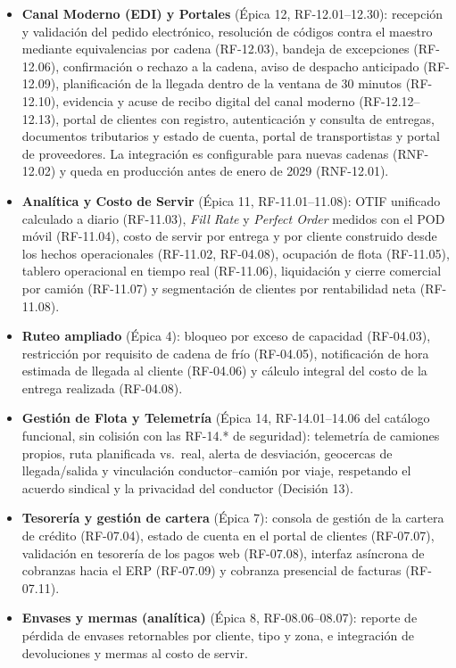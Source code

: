 \begin{itemize}
  \item \textbf{Canal Moderno (EDI) y Portales} (Épica 12, RF-12.01--12.30): recepción y validación del pedido electrónico, resolución de códigos contra el maestro mediante equivalencias por cadena (RF-12.03), bandeja de excepciones (RF-12.06), confirmación o rechazo a la cadena, aviso de despacho anticipado (RF-12.09), planificación de la llegada dentro de la ventana de 30 minutos (RF-12.10), evidencia y acuse de recibo digital del canal moderno (RF-12.12--12.13), portal de clientes con registro, autenticación y consulta de entregas, documentos tributarios y estado de cuenta, portal de transportistas y portal de proveedores. La integración es configurable para nuevas cadenas (RNF-12.02) y queda en producción antes de enero de 2029 (RNF-12.01).
  \item \textbf{Analítica y Costo de Servir} (Épica 11, RF-11.01--11.08): OTIF unificado calculado a diario (RF-11.03), \emph{Fill Rate} y \emph{Perfect Order} medidos con el POD móvil (RF-11.04), costo de servir por entrega y por cliente construido desde los hechos operacionales (RF-11.02, RF-04.08), ocupación de flota (RF-11.05), tablero operacional en tiempo real (RF-11.06), liquidación y cierre comercial por camión (RF-11.07) y segmentación de clientes por rentabilidad neta (RF-11.08).
  \item \textbf{Ruteo ampliado} (Épica 4): bloqueo por exceso de capacidad (RF-04.03), restricción por requisito de cadena de frío (RF-04.05), notificación de hora estimada de llegada al cliente (RF-04.06) y cálculo integral del costo de la entrega realizada (RF-04.08).
  \item \textbf{Gestión de Flota y Telemetría} (Épica 14, RF-14.01--14.06 del catálogo funcional, sin colisión con las RF-14.* de seguridad): telemetría de camiones propios, ruta planificada vs.\ real, alerta de desviación, geocercas de llegada/salida y vinculación conductor--camión por viaje, respetando el acuerdo sindical y la privacidad del conductor (Decisión 13).
  \item \textbf{Tesorería y gestión de cartera} (Épica 7): consola de gestión de la cartera de crédito (RF-07.04), estado de cuenta en el portal de clientes (RF-07.07), validación en tesorería de los pagos web (RF-07.08), interfaz asíncrona de cobranzas hacia el ERP (RF-07.09) y cobranza presencial de facturas (RF-07.11).
  \item \textbf{Envases y mermas (analítica)} (Épica 8, RF-08.06--08.07): reporte de pérdida de envases retornables por cliente, tipo y zona, e integración de devoluciones y mermas al costo de servir.
\end{itemize}

